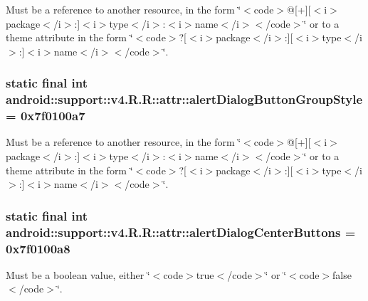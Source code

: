 Must be a reference to another resource, in the form \char`\"{}$<$code$>$@\mbox{[}+\mbox{]}\mbox{[}$<$i$>$package$<$/i$>$:\mbox{]}$<$i$>$type$<$/i$>$:$<$i$>$name$<$/i$>$$<$/code$>$\char`\"{} or to a theme attribute in the form \char`\"{}$<$code$>$?\mbox{[}$<$i$>$package$<$/i$>$:\mbox{]}\mbox{[}$<$i$>$type$<$/i$>$:\mbox{]}$<$i$>$name$<$/i$>$$<$/code$>$\char`\"{}. \hypertarget{classandroid_1_1support_1_1v4_1_1_r_1_1attr_ab161682434ffbc210eb483d22544342}{
\subsubsection[{alertDialogButtonGroupStyle}]{\setlength{\rightskip}{0pt plus 5cm}static final int android::support::v4.R.R::attr::alertDialogButtonGroupStyle = 0x7f0100a7}}
\label{classandroid_1_1support_1_1v4_1_1_r_1_1attr_ab161682434ffbc210eb483d22544342}


Must be a reference to another resource, in the form \char`\"{}$<$code$>$@\mbox{[}+\mbox{]}\mbox{[}$<$i$>$package$<$/i$>$:\mbox{]}$<$i$>$type$<$/i$>$:$<$i$>$name$<$/i$>$$<$/code$>$\char`\"{} or to a theme attribute in the form \char`\"{}$<$code$>$?\mbox{[}$<$i$>$package$<$/i$>$:\mbox{]}\mbox{[}$<$i$>$type$<$/i$>$:\mbox{]}$<$i$>$name$<$/i$>$$<$/code$>$\char`\"{}. \hypertarget{classandroid_1_1support_1_1v4_1_1_r_1_1attr_a6bfce1bed1fb7720cf2e5fc7a3d984e}{
\subsubsection[{alertDialogCenterButtons}]{\setlength{\rightskip}{0pt plus 5cm}static final int android::support::v4.R.R::attr::alertDialogCenterButtons = 0x7f0100a8}}
\label{classandroid_1_1support_1_1v4_1_1_r_1_1attr_a6bfce1bed1fb7720cf2e5fc7a3d984e}


Must be a boolean value, either \char`\"{}$<$code$>$true$<$/code$>$\char`\"{} or \char`\"{}$<$code$>$false$<$/code$>$\char`\"{}. 


